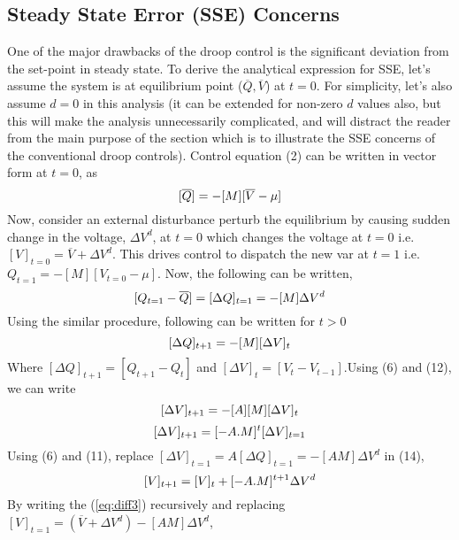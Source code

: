 \documentclass[journal]{IEEEtran}
\begin{document}
\subsection{Steady State Error (SSE) Concerns}
One of the major drawbacks of the droop control is the significant deviation from the set-point in steady state. To derive the analytical expression for SSE, let’s assume the system is at equilibrium point ($\overline{Q},\overline{V}$) at $t=0$. For simplicity, let's also assume $d=0$ in this analysis (it can be extended for non-zero $d$ values also, but this will make the analysis unnecessarily complicated, and will distract the reader from the main purpose of the section which is to illustrate the SSE concerns of the conventional droop controls). Control equation (2) can be written in vector form at $t=0$, as
\begin{equation}
\small
\label{eq:eqb}
[\overline{Q}]=-[M][\overline{V}-\mu]
\end{equation}
Now, consider an external disturbance perturb the equilibrium by causing sudden change in the voltage, $\Delta V^d$, at $t=0$ which changes the voltage at $t=0$ i.e. {\small $[V]_{t=0}=\overline V+ \Delta V^d$}. This drives control to dispatch the new var at $t=1$ i.e. $Q_{t=1}=-[M][V_{t=0}-\mu]$. Now, the following can be written,
\begin{equation}
\small
\label{eq:eqb}
[Q_{t=1}-\overline{Q}]=[\Delta Q]_{t=1}=-[M]\Delta V^d
\end{equation}
Using the similar procedure, following can be written for $t>0$
\begin{equation}
\small
\label{eq:diff1}
[\Delta Q]_{t+1}=-[M][\Delta V]_t
\end{equation}
Where {\small $[\Delta Q]_{t+1}=[Q_{t+1}-Q_t]$} and {\small $[\Delta V]_t=[V_t-V_{t-1}]$}.Using (6) and (12), we can write
\begin{equation}
\small
\label{eq:diff2}
[\Delta V]_{t+1}=-[A][M][\Delta V]_t
\end{equation}
\begin{equation}
\small
\label{eq:diff3}
[\Delta V]_{t+1}=[-A.M]^t[\Delta V]_{t=1}
\end{equation}
Using (6) and (11), replace {\small $[\Delta V]_{t=1}=A[\Delta Q]_{t=1}=-[AM]\Delta V^d$} in (14),
\begin{equation}
\small
\label{eq:diff3}
[V]_{t+1}=[V]_t+[-A.M]^{t+1}\Delta V^d
\end{equation}
By writing the (\ref{eq:diff3}) recursively and replacing {\small$[V]_{t=1}=(\overline V+\Delta V^d)-[AM]\Delta V^d$}, 
\end{document}
